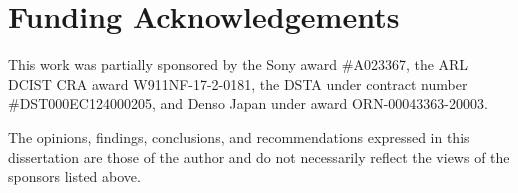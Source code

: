\chapter*{Funding Acknowledgements}

This work was partially sponsored by the Sony award \#A023367, the ARL DCIST CRA award W911NF-17-2-0181, the DSTA under contract number \#DST000EC124000205, and Denso Japan under award ORN-00043363-20003.

The opinions, findings, conclusions, and recommendations expressed in this dissertation are those of the author and do not necessarily reflect the views of the sponsors listed above.
